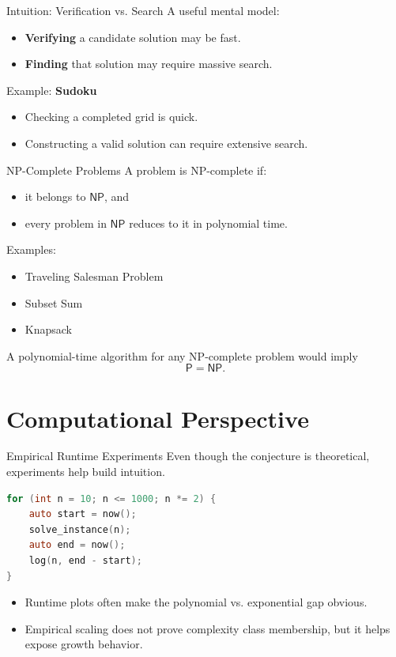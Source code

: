 \documentclass[aspectratio=43]{beamer}
\begin{document}
\begin{frame}{Intuition: Verification vs. Search}
A useful mental model:
\begin{itemize}
    \item \textbf{Verifying} a candidate solution may be fast.
    \item \textbf{Finding} that solution may require massive search.
\end{itemize}

\medskip
Example: \textbf{Sudoku}
\begin{itemize}
    \item Checking a completed grid is quick.
    \item Constructing a valid solution can require extensive search.
\end{itemize}
\end{frame}

\begin{frame}{NP-Complete Problems}
A problem is NP-complete if:
\begin{itemize}
    \item it belongs to $\mathsf{NP}$, and
    \item every problem in $\mathsf{NP}$ reduces to it in polynomial time.
\end{itemize}

\medskip
Examples:
\begin{itemize}
    \item Traveling Salesman Problem
    \item Subset Sum
    \item Knapsack
\end{itemize}

\medskip
A polynomial-time algorithm for any NP-complete problem would imply
\[
\mathsf{P}=\mathsf{NP}.
\]
\end{frame}

\section{Computational Perspective}

\begin{frame}{Empirical Runtime Experiments}
Even though the conjecture is theoretical, experiments help build intuition.

\begin{lstlisting}[language=C]
for (int n = 10; n <= 1000; n *= 2) {
    auto start = now();
    solve_instance(n);
    auto end = now();
    log(n, end - start);
}
\end{lstlisting}

\begin{itemize}
    \item Runtime plots often make the polynomial vs. exponential gap obvious.
    \item Empirical scaling does not prove complexity class membership, but it helps expose growth behavior.
\end{itemize}
\end{frame}
\end{document}
